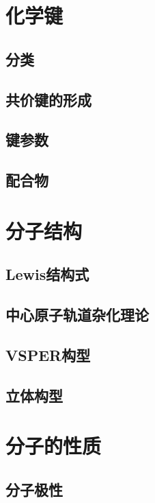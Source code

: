 \documentclass[a4paper]{article}
\begin{document}
	
	\clearpage
	\section{化学键}
	
	
	\subsection{分类}
	
	
	\subsection{共价键的形成}
	
	
	\subsection{键参数}
	
	
	\subsection{配合物}
	
	
	\clearpage
	\section{分子结构}
	
	
	\subsection{Lewis结构式}
	
	
	\subsection{中心原子轨道杂化理论}
	
	
	\subsection{VSPER构型}
	
	
	\subsection{立体构型}
	
	
	\clearpage
	\section{分子的性质}
	
	
	\subsection{分子极性}
	
\end{document}
